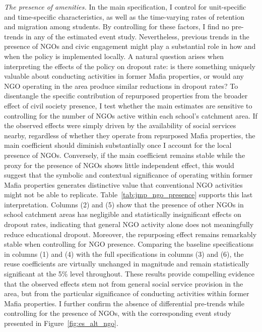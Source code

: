 \documentclass[12pt]{article}
\theoremstyle{plain}
\theoremstyle{plain}
\theoremstyle{plain}
\theoremstyle{definition}
\theoremstyle{plain}
\theoremstyle{definition}
\theoremstyle{plain}
\theoremstyle{remark}
\theoremstyle{definition}
\theoremstyle{definition}
\theoremstyle{plain}
\begin{document}
\emph{The presence of amenities.} In the main specification, I control for unit-specific and time-specific characteristics, as well as the time-varying rates of retention and migration among students. By controlling for these factors, I find no pre-trends in any of the estimated event study. Nevertheless, previous trends in the presence of NGOs and civic engagement might play a substantial role in how and when the policy is implemented locally. A natural question arises when interpreting the effects of the policy on dropout rate: is there something uniquely valuable about conducting activities in former Mafia properties, or would any NGO operating in the area produce similar reductions in dropout rates? To disentangle the specific contribution of repurposed properties from the broader effect of civil society presence, I test whether the main estimates are sensitive to controlling for the number of NGOs active within each school's catchment area. If the observed effects were simply driven by the availability of social services nearby, regardless of whether they operate from repurposed Mafia properties, the main coefficient should diminish substantially once I account for the local presence of NGOs. Conversely, if the main coefficient remains stable while the proxy for the presence of NGOs shows little independent effect, this would suggest that the symbolic and contextual significance of operating within former Mafia properties generates distinctive value that conventional NGO activities might not be able to replicate.
Table~\ref{tab:jmp_ngo_presence} supports this last interpretation. Columns (2) and (5) show that the presence of other NGOs in school catchment areas has negligible and statistically insignificant effects on dropout rates, indicating that general NGO activity alone does not meaningfully reduce educational dropout. Moreover, the repurposing effect remains remarkably stable when controlling for NGO presence. Comparing the baseline specifications in columns (1) and (4) with the full specifications in columns (3) and (6), the reuse coefficients are virtually unchanged in magnitude and remain statistically significant at the 5\% level throughout. These results provide compelling evidence that the observed effects stem not from general social service provision in the area, but from the particular significance of conducting activities within former Mafia properties. I further confirm the absence of differential pre-trends while controlling for the presence of NGOs, with the corresponding event study presented in Figure~\ref{fig:es_alt_ngo}. \par
\end{document}
